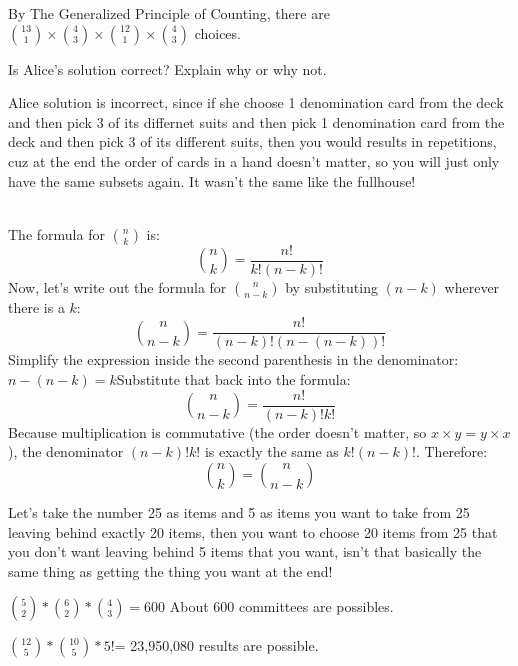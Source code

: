 \documentclass[12pt]{article}
\begin{document}
\begin{enumerate}
{\begin{tcolorbox}
By The Generalized Principle of Counting, there are $ \binom{13}{1} \times \binom{4}{3} \times \binom{12}{1} \times \binom{4}{3}$ choices.

\end{tcolorbox}

Is Alice's solution correct? Explain why or why not.}
Alice solution is incorrect, since if she choose 1 denomination card from the deck and then  pick 3 of its differnet suits and then pick 1 denomination card from the deck and then pick 3 of its different suits, then you would results in repetitions, cuz at the end the order of cards in a hand doesn't matter, so you will just only have the same subsets again. It wasn't the same like the fullhouse!

\\
The formula for $\binom{n}{k}$ is:$$\binom{n}{k} = \frac{n!}{k!(n-k)!}$$Now, let's write out the formula for $\binom{n}{n-k}$ by substituting $(n-k)$ wherever there is a $k$:$$\binom{n}{n-k} = \frac{n!}{(n-k)!(n-(n-k))!}$$Simplify the expression inside the second parenthesis in the denominator:$n - (n - k) = k$Substitute that back into the formula:$$\binom{n}{n-k} = \frac{n!}{(n-k)!k!}$$Because multiplication is commutative (the order doesn't matter, so $x \times y = y \times x$), the denominator $(n-k)!k!$ is exactly the same as $k!(n-k)!$. Therefore:$$\binom{n}{k} = \binom{n}{n-k}$$


Let's take the number 25 as items and 5 as items you want to take from 25 leaving behind exactly 20 items, then you want to choose 20 items from 25 that you don't want leaving behind 5 items that you want, isn't that basically the same thing as getting the thing you want at the end!


 $\binom{5}{2}*\binom{6}{2}*\binom{4}{3}=600$
About 600 committees are possibles.

$\binom{12}{5}* \binom{10}{5}*5!$= 23,950,080 results are possible. 



\end{enumerate}
\end{document}
